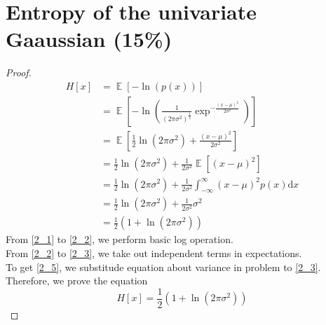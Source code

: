 \documentclass[12pt]{article}
\numberwithin{equation}{section}
\DeclareMathOperator{\E}{\mathbb{E}}
\begin{document}
\section{Entropy of the univariate Gaaussian (15\%)}
\begin{proof}
\begin{align}
  H[x] & = \E[-\ln(p(x))]\nonumber\\
       & = \E\left[-\ln\left(\frac{1}{(2\pi\sigma^2)^\frac{1}{2}}\exp^{-\frac{(x-\mu)^2}{2\sigma^2}}\right)\right]\label{2_1}\\
       & = \E\left[\frac{1}{2}\ln(2\pi\sigma^2)+\frac{(x-\mu)^2}{2\sigma^2}\right]\label{2_2}\\
       & = \frac{1}{2}\ln(2\pi\sigma^2)+\frac{1}{2\sigma^2}\E\left[(x-\mu)^2\right]\label{2_3}\\
       & = \frac{1}{2}\ln(2\pi\sigma^2)+\frac{1}{2\sigma^2}\int_{-\infty}^{\infty}(x-\mu)^2p(x)\mathrm{d}x\label{2_4}\\
       & = \frac{1}{2}\ln(2\pi\sigma^2)+\frac{1}{2\sigma^2}\sigma^2\label{2_5}\\
       & = \frac{1}{2}\left(1+\ln(2\pi\sigma^2)\right)\nonumber
\end{align}
  From \eqref{2_1} to \eqref{2_2}, we perform basic log operation.\\
  From \eqref{2_2} to \eqref{2_3}, we take out independent terms in expectations.\\
  To get \eqref{2_5}, we substitude equation about variance in problem to \eqref{2_3}.\\
  Therefore, we prove the equation $$H[x] = \frac{1}{2}\left(1+\ln(2\pi\sigma^2)\right)$$
\end{proof}
\end{document}
